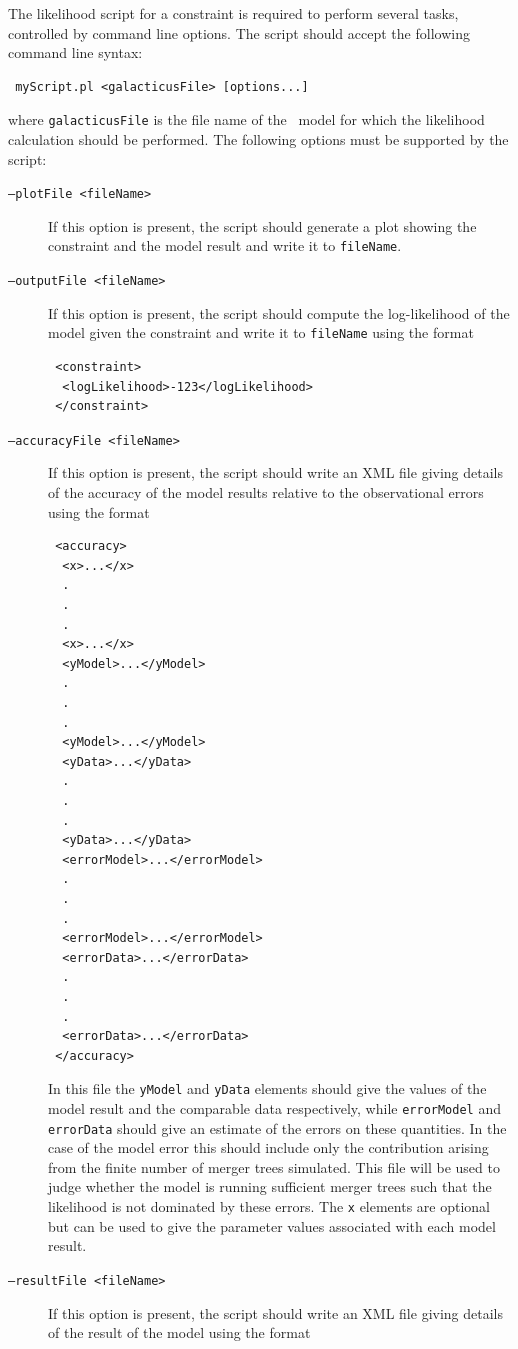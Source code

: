 The likelihood script for a constraint is required to perform several tasks, controlled by command line options. The script should accept the following command line syntax:
\begin{verbatim}
 myScript.pl <galacticusFile> [options...]
\end{verbatim}
where {\tt galacticusFile} is the file name of the \glc\ model for which the likelihood calculation should be performed. The following options must be supported by the script:
\begin{description}
 \item [{\tt --plotFile <fileName>}] If this option is present, the script should generate a plot showing the constraint and the model result and write it to {\tt fileName}.
 \item [{\tt --outputFile <fileName>}] If this option is present, the script should compute the log-likelihood of the model given the constraint and write it to {\tt fileName} using the format
\begin{verbatim}
 <constraint>
  <logLikelihood>-123</logLikelihood>
 </constraint>
\end{verbatim}
 \item [{\tt --accuracyFile <fileName>}] If this option is present, the script should write an XML file giving details of the accuracy of the model results relative to the observational errors using the format
\begin{verbatim}
 <accuracy>
  <x>...</x>
  .
  .
  .
  <x>...</x>
  <yModel>...</yModel>
  .
  .
  .
  <yModel>...</yModel>
  <yData>...</yData>
  .
  .
  .
  <yData>...</yData>
  <errorModel>...</errorModel>
  .
  .
  .
  <errorModel>...</errorModel>
  <errorData>...</errorData>
  .
  .
  .
  <errorData>...</errorData>
 </accuracy>
\end{verbatim}
In this file the {\tt yModel} and {\tt yData} elements should give the values of the model result and the comparable data respectively, while {\tt errorModel} and {\tt errorData} should give an estimate of the errors on these quantities. In the case of the model error this should include only the contribution arising from the finite number of merger trees simulated. This file will be used to judge whether the model is running sufficient merger trees such that the likelihood is not dominated by these errors. The {\tt x} elements are optional but can be used to give the parameter values associated with each model result.
 \item [{\tt --resultFile <fileName>}] If this option is present, the script should write an XML file giving details of the result of the model using the format

\end{description}
